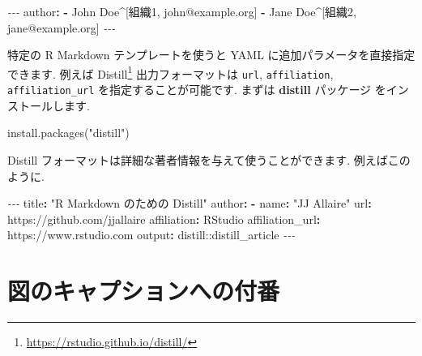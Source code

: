 \documentclass[
  11pt,
  lualatex,
  ja=standard]{bxjsreport}
\newenvironment{Shaded}{\begin{snugshade}}{\end{snugshade}}
\newcommand{\AttributeTok}[1]{\textcolor[rgb]{0.77,0.63,0.00}{#1}}
\newcommand{\FunctionTok}[1]{\textcolor[rgb]{0.00,0.00,0.00}{#1}}
\newcommand{\KeywordTok}[1]{\textcolor[rgb]{0.13,0.29,0.53}{\textbf{#1}}}
\newcommand{\NormalTok}[1]{#1}
\newcommand{\PreprocessorTok}[1]{\textcolor[rgb]{0.56,0.35,0.01}{\textit{#1}}}
\newcommand{\StringTok}[1]{\textcolor[rgb]{0.31,0.60,0.02}{#1}}
\renewcommand{\href}[2]{#2\footnote{\url{#1}}}
\begin{document}
\begin{Shaded}
\begin{Highlighting}[]
\PreprocessorTok{{-}{-}{-}}
\FunctionTok{author}\KeywordTok{:}
\AttributeTok{  }\KeywordTok{{-}}\AttributeTok{ John Doe\^{}[組織1, john@example.org]}
\AttributeTok{  }\KeywordTok{{-}}\AttributeTok{ Jane Doe\^{}[組織2, jane@example.org]}
\PreprocessorTok{{-}{-}{-}}
\end{Highlighting}
\end{Shaded}

特定の R Markdown テンプレートを使うと YAML に追加パラメータを直接指定できます. 例えば \href{https://rstudio.github.io/distill/}{Distill} 出力フォーマットは \texttt{url}, \texttt{affiliation}, \texttt{affiliation\_url} を指定することが可能です. まずは \textbf{distill} パッケージ \autocite{R-distill} をインストールします.

\begin{Shaded}
\begin{Highlighting}[numbers=left,,]
\FunctionTok{install.packages}\NormalTok{(}\StringTok{"distill"}\NormalTok{)}
\end{Highlighting}
\end{Shaded}

Distill フォーマットは詳細な著者情報を与えて使うことができます. 例えばこのように.

\begin{Shaded}
\begin{Highlighting}[]
\PreprocessorTok{{-}{-}{-}}
\FunctionTok{title}\KeywordTok{:}\AttributeTok{ }\StringTok{"R Markdown のための Distill"}
\FunctionTok{author}\KeywordTok{:}
\AttributeTok{  }\KeywordTok{{-}}\AttributeTok{ }\FunctionTok{name}\KeywordTok{:}\AttributeTok{ }\StringTok{"JJ Allaire"}
\AttributeTok{    }\FunctionTok{url}\KeywordTok{:}\AttributeTok{ https://github.com/jjallaire}
\AttributeTok{    }\FunctionTok{affiliation}\KeywordTok{:}\AttributeTok{ RStudio}
\AttributeTok{    }\FunctionTok{affiliation\_url}\KeywordTok{:}\AttributeTok{ https://www.rstudio.com}
\FunctionTok{output}\KeywordTok{:}\AttributeTok{ distill::distill\_article}
\PreprocessorTok{{-}{-}{-}}
\end{Highlighting}
\end{Shaded}

\hypertarget{figure-number}{%
\section{図のキャプションへの付番}\label{figure-number}}
\end{document}
